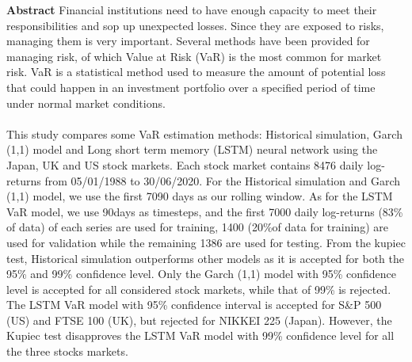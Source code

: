 \begin{titlepage}
	\textbf{\LARGE Abstract}\newline\newline
Financial institutions need to have enough capacity to meet their responsibilities and sop up unexpected losses. Since they are exposed to risks, managing them is very important. Several methods have been provided for managing risk, of which Value at Risk (VaR) is the most common for market risk. VaR is a statistical method used to measure the amount of potential loss that could happen in an investment portfolio over a specified period of time under normal market conditions.\\\\ This study compares some VaR estimation methods: Historical simulation, Garch (1,1) model and Long short term memory (LSTM) neural network using the Japan, UK and US stock markets. Each stock market contains 8476 daily log-returns from 05/01/1988 to 30/06/2020. For the Historical simulation and Garch (1,1) model, we use the first 7090 days as our rolling window. As for the LSTM VaR model, we use 90days as timesteps, and the first 7000 daily log-returns (83\% of data) of each series are used for training, 1400 (20\%of data for training) are used for validation while the remaining 1386 are used for testing. From the kupiec test, Historical simulation outperforms other models as it is accepted for both the 95\% and 99\% confidence level. Only the Garch (1,1) model with 95\% confidence level is accepted for all considered stock markets, while that of 99\% is rejected. The LSTM VaR model with 95\% confidence interval is accepted for S\&P 500 (US) and  FTSE 100 (UK), but rejected for NIKKEI 225 (Japan). However, the Kupiec test disapproves the LSTM VaR model with 99\% confidence level for all the three stocks markets.


\end{titlepage}
\thispagestyle{empty}

\newpage\null\thispagestyle{empty}\newpage

